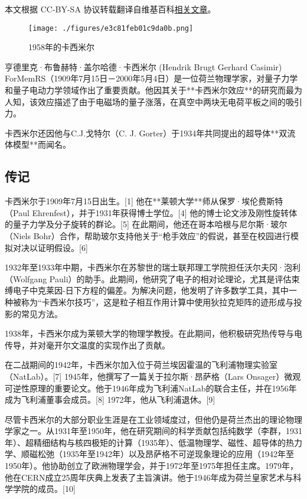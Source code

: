 
本文根据 CC-BY-SA 协议转载翻译自维基百科\href{https://en.wikipedia.org/wiki/Hendrik_Casimir}{相关文章}。

\begin{figure}[ht]
\centering
\texttt{[image: ./figures/e3c81feb01c9da0b.png]}
\caption{1958年的卡西米尔} \label{fig_KXMR_1}
\end{figure}
亨德里克·布鲁赫特·盖尔哈德·卡西米尔 (Hendrik Brugt Gerhard Casimir) ForMemRS（1909年7月15日－2000年5月4日）是一位荷兰物理学家，对量子力学和量子电动力学领域作出了重要贡献。他因其关于**卡西米尔效应**的研究而最为人知，该效应描述了由于电磁场的量子涨落，在真空中两块无电荷平板之间的吸引力。

卡西米尔还因他与C.J.戈特尔（C. J. Gorter）于1934年共同提出的超导体**双流体模型**而闻名。
\subsection{传记}
卡西米尔于1909年7月15日出生。[1] 他在**莱顿大学**师从保罗·埃伦费斯特（Paul Ehrenfest），并于1931年获得博士学位。[4] 他的博士论文涉及刚性旋转体的量子力学及分子旋转的群论。[5] 在此期间，他还在哥本哈根与尼尔斯·玻尔（Niels Bohr）合作，帮助玻尔支持他关于“枪手效应”的假说，甚至在校园进行模拟对决以证明假设。[6]

1932年至1933年中期，卡西米尔在苏黎世的瑞士联邦理工学院担任沃尔夫冈·泡利（Wolfgang Pauli）的助手。此期间，他研究了电子的相对论理论，尤其是评估束缚电子中克莱因-日下方程的偏差。为解决问题，他发明了许多数学工具，其中一种被称为“卡西米尔技巧”，这是粒子相互作用计算中使用狄拉克矩阵的迹形成与投影的常见方法。

1938年，卡西米尔成为莱顿大学的物理学教授。在此期间，他积极研究热传导与电传导，并对毫开尔文温度的实现作出了贡献。

在二战期间的1942年，卡西米尔加入位于荷兰埃因霍温的飞利浦物理实验室（NatLab）。[7] 1945年，他撰写了一篇关于拉尔斯·昂萨格（Lars Onsager）微观可逆性原理的重要论文。他于1946年成为飞利浦NatLab的联合主任，并在1956年成为飞利浦董事会成员。[8] 1972年，他从飞利浦退休。[9]

尽管卡西米尔的大部分职业生涯是在工业领域度过，但他仍是荷兰杰出的理论物理学家之一。从1931年至1950年，他在研究期间的科学贡献包括纯数学（李群，1931年）、超精细结构与核四极矩的计算（1935年）、低温物理学、磁性、超导体的热力学、顺磁松弛（1935年至1942年）以及昂萨格不可逆现象理论的应用（1942年至1950年）。他协助创立了欧洲物理学会，并于1972年至1975年担任主席。1979年，他在CERN成立25周年庆典上发表了主旨演讲。他于1946年成为荷兰皇家艺术与科学学院的成员。[10]

